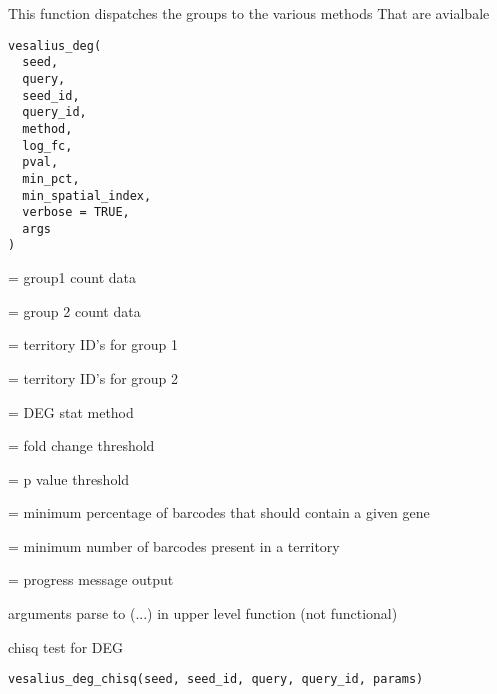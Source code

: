 \documentclass[a4paper]{book}
\begin{document}
%
\begin{Description}
This function dispatches the groups to the various methods 
That are avialbale
\end{Description}
%
\begin{Usage}
\begin{verbatim}
vesalius_deg(
  seed,
  query,
  seed_id,
  query_id,
  method,
  log_fc,
  pval,
  min_pct,
  min_spatial_index,
  verbose = TRUE,
  args
)
\end{verbatim}
\end{Usage}
%
\begin{Arguments}
\begin{ldescription}
\item[\code{seed}] = group1 count data

\item[\code{query}] = group 2 count data

\item[\code{seed\_id}] = territory ID's for group 1

\item[\code{query\_id}] = territory ID's for group 2

\item[\code{method}] = DEG stat method

\item[\code{log\_fc}] = fold change threshold

\item[\code{pval}] = p value threshold

\item[\code{min\_pct}] = minimum percentage of barcodes that should contain a
given gene

\item[\code{min\_spatial\_index}] = minimum number of barcodes present in a territory

\item[\code{verbose}] = progress message output

\item[\code{args}] arguments parse to (...) in upper level function (not functional)
\end{ldescription}
\end{Arguments}
%
\begin{Description}
chisq test for DEG
\end{Description}
%
\begin{Usage}
\begin{verbatim}
vesalius_deg_chisq(seed, seed_id, query, query_id, params)
\end{verbatim}
\end{Usage}
\end{document}
